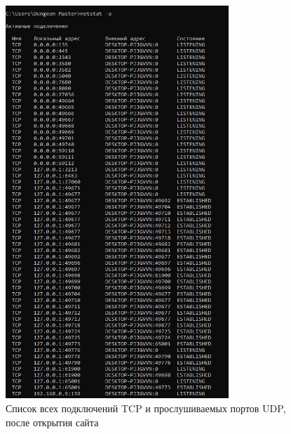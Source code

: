 \documentclass[bachelor, och, labwork]{shiza}
\begin{document}
\begin{enumerate}
    \begin{figure}[H]
        \centering      %
        \includegraphics[width=0.75\textwidth]{7}
        \caption{Список всех подключений TCP и прослушиваемых портов UDP, после открытия сайта}
        \label{fig:image1}
    \end{figure}


\end{enumerate}
\end{document}

